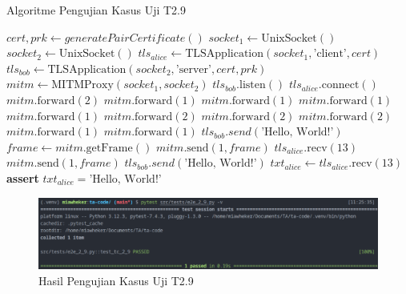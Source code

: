 \begin{algorithm}
  \caption{Algoritme Pengujian Kasus Uji T2.9}
  \label{alg:unit.test.t2.9}
  \begin{algorithmic}
    \State $cert, prk \gets generatePairCertificate()$
    \State $socket_1 \gets \text{UnixSocket}()$
    \State $socket_2 \gets \text{UnixSocket}()$
    \State $tls_{alice} \gets \text{TLSApplication}(socket_1, \text{'client'}, cert)$ 
    \State $tls_{bob} \gets \text{TLSApplication}(socket_2, \text{'server'}, cert, prk)$
    \State $mitm \gets \text{MITMProxy}(socket_1, socket_2)$
    \State
    \State $tls_{bob}.\text{listen}()$  
    \State $tls_{alice}.\text{connect}()$  
    \State
    \State $mitm.\text{forward}(2)$ 
    \State $mitm.\text{forward}(1)$ 
    \State $mitm.\text{forward}(1)$ 
    \State $mitm.\text{forward}(1)$ 
    \State $mitm.\text{forward}(1)$ 
    \State $mitm.\text{forward}(2)$ 
    \State $mitm.\text{forward}(2)$ 
    \State $mitm.\text{forward}(2)$ 
    \State $mitm.\text{forward}(1)$ 
    \State $mitm.\text{forward}(1)$ 
    \State
    \State $tls_{bob}.send(\text{'Hello, World!'})$
    \State $frame \gets mitm.\text{getFrame}()$
    \State $mitm.\text{send}(1, frame)$
    \State
    \State $tls_{alice}.\text{recv}(13)$ 
    \State $mitm.\text{send}(1, frame)$ 
    \State 
    \State $tls_{bob}.send(\text{'Hello, World!'})$
    \State $txt_{alice} \gets tls_{alice}.\text{recv}(13)$
    \State \textbf{assert} $txt_{alice} = \text{'Hello, World!'}$
  \end{algorithmic}
\end{algorithm}

\begin{figure}[ht]
  \centering
  \includegraphics[width=\textwidth]{chapters/res/appendix-4/2.9.png}
  \caption{Hasil Pengujian Kasus Uji T2.9}
  \label{fig:unit.test.t2.9}
\end{figure}

